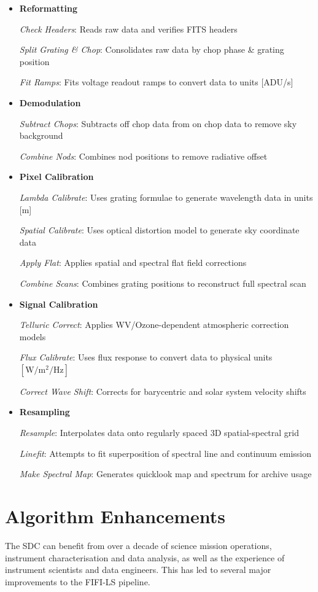 \documentclass[11pt,twoside]{article}
\begin{document}
\begin{itemize}
\setlength{\itemindent}{-1.5em}
\setlength{\parskip}{2pt}
\setlength{\parindent}{-1.5em}
\item \textbf{Reformatting}\smallskip

\emph{Check Headers}: Reads raw data and verifies FITS headers

\emph{Split Grating \& Chop}: Consolidates raw data by chop phase \& grating position

\emph{Fit Ramps}: Fits voltage readout ramps to convert data to units [ADU/s]
\item \textbf{Demodulation}\smallskip

\emph{Subtract Chops}: Subtracts off chop data from on chop data to remove sky background

\emph{Combine Nods}: Combines nod positions to remove radiative offset
\item \textbf{Pixel Calibration}\smallskip

\emph{Lambda Calibrate}: Uses grating formulae to generate wavelength data in units [\textmu m]

\emph{Spatial Calibrate}: Uses optical distortion model to generate sky coordinate data

\emph{Apply Flat}: Applies spatial and spectral flat field corrections

\emph{Combine Scans}: Combines grating positions to reconstruct full spectral scan
\item \textbf{Signal Calibration}\smallskip

\emph{Telluric Correct}: Applies WV/Ozone-dependent atmospheric correction models

\emph{Flux Calibrate}: Uses flux response to convert data to physical units $[\mathrm{W/m^2/Hz}]$

\emph{Correct Wave Shift}: Corrects for barycentric and solar system velocity shifts
\item \textbf{Resampling}\smallskip

\emph{Resample}: Interpolates data onto regularly spaced 3D spatial-spectral grid

\emph{Linefit}: Attempts to fit superposition of spectral line and continuum emission

\emph{Make Spectral Map}: Generates quicklook map and spectrum for archive usage
\end{itemize}

\section{Algorithm Enhancements}
The SDC can benefit from over a decade of science mission operations, instrument characterisation and
data analysis, as well as the experience of instrument scientists and data engineers. This has
led to several major improvements to the FIFI-LS pipeline.\smallskip
\end{document}
